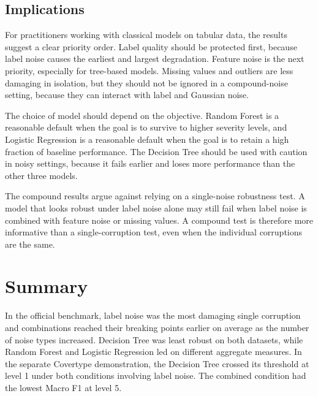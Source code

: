 \subsection{Implications}

For practitioners working with classical models on tabular data, the results suggest a clear priority order. Label quality should be protected first, because label noise causes the earliest and largest degradation. Feature noise is the next priority, especially for tree-based models. Missing values and outliers are less damaging in isolation, but they should not be ignored in a compound-noise setting, because they can interact with label and Gaussian noise.

The choice of model should depend on the objective. Random Forest is a reasonable default when the goal is to survive to higher severity levels, and Logistic Regression is a reasonable default when the goal is to retain a high fraction of baseline performance. The Decision Tree should be used with caution in noisy settings, because it fails earlier and loses more performance than the other three models.

The compound results argue against relying on a single-noise robustness test. A model that looks robust under label noise alone may still fail when label noise is combined with feature noise or missing values. A compound test is therefore more informative than a single-corruption test, even when the individual corruptions are the same.

\section{Summary}

In the official benchmark, label noise was the most damaging single corruption and combinations reached their breaking points earlier on average as the number of noise types increased. Decision Tree was least robust on both datasets, while Random Forest and Logistic Regression led on different aggregate measures. In the separate Covertype demonstration, the Decision Tree crossed its threshold at level 1 under both conditions involving label noise. The combined condition had the lowest Macro F1 at level 5.
